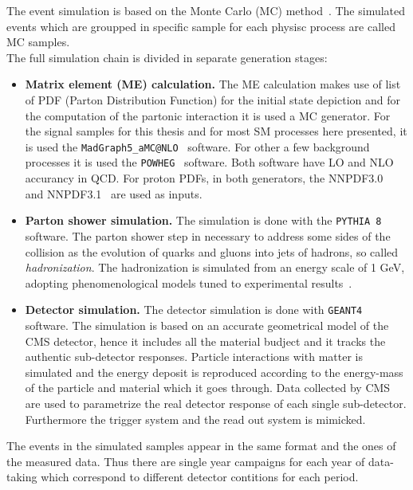 The event simulation is based on the Monte Carlo (MC)
method~\cite{mc}. The simulated events
 which are groupped in specific
sample for each physisc process are called MC samples.\\
The full simulation chain is divided in separate generation stages:
\begin{itemize}
\setlength\itemsep{-0.1em}
\item \textbf{Matrix element (ME) calculation.} The ME calculation
  makes use of list of PDF (Parton Distribution Function) for the initial state
  depiction and for the computation of the partonic interaction it is
  used a MC generator. For the signal samples for this thesis and for
  most SM processes here presented, it is used the \texttt{MadGraph5\_aMC@NLO}~\cite{Alwall_2014}
  software. For other a few background processes it
  is used the \texttt{POWHEG}~\cite{Alioli_2010} software. Both
  software have LO and NLO accurancy in QCD. For proton PDFs, in both
  generators, the NNPDF3.0~\cite{Ball_2015} and NNPDF3.1~\cite{Ball_2017} are used as inputs.
\item \textbf{Parton shower simulation.} The simulation is done with
  the \texttt{PYTHIA 8}~\cite{Sj_strand_2008, Sj_strand_2015}
  software. The parton shower step in necessary to address some sides
  of the collision as the evolution of quarks and gluons into jets of
  hadrons, so called \emph{hadronization}. The hadronization is simulated from
  an energy scale of 1 GeV, adopting phenomenological models tuned to
  experimental results~\cite{Skands_2014, Khachatryan_2016_ps, Sirunyan_2020_ps}.
\item \textbf{Detector simulation.} The detector simulation is done
  with \texttt{GEANT4}~\cite{AGOSTINELLI2003250} software. The
  simulation is based on an accurate geometrical model of the CMS
  detector, hence it includes all the material budject and it tracks
  the authentic sub-detector responses. Particle interactions with
  matter is simulated and the energy deposit is reproduced according to the
  energy-mass of the particle and material which it goes through. Data collected by CMS are used to
  parametrize the real detector response of each single
  sub-detector. Furthermore the trigger system and the read out system
  is mimicked. 
\end{itemize}

The events in the simulated samples appear in the same format and the
ones of the measured data. Thus there are single year campaigns for
each year of data-taking which correspond to different detector
contitions for each period. 
 

